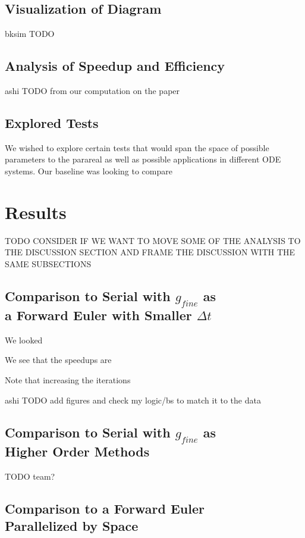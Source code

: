 \documentclass[letterpaper,twocolumn,11pt]{article}
\begin{document}
\subsection{Visualization of Diagram}
bksim TODO

\subsection{Analysis of Speedup and Efficiency}

ashi TODO from our computation on the paper

\subsection{Explored Tests}
We wished to explore certain tests that would span the space of possible parameters to the parareal as well as possible applications in different ODE systems.  Our baseline was looking to compare 

\section{Results}

TODO CONSIDER IF WE WANT TO MOVE SOME OF THE ANALYSIS TO THE DISCUSSION SECTION AND FRAME THE DISCUSSION WITH THE SAME SUBSECTIONS

\subsection{Comparison to Serial with $g_{fine}$ as \\a Forward Euler with
Smaller $\Delta t$}

We looked 

We see that the speedups are

Note that increasing the iterations

ashi TODO add figures and check my logic/bs to match it to the data

\subsection{Comparison to Serial with $g_{fine}$ as \\Higher Order Methods}

TODO team?

\subsection{Comparison to a Forward Euler \\Parallelized by Space}
\end{document}
